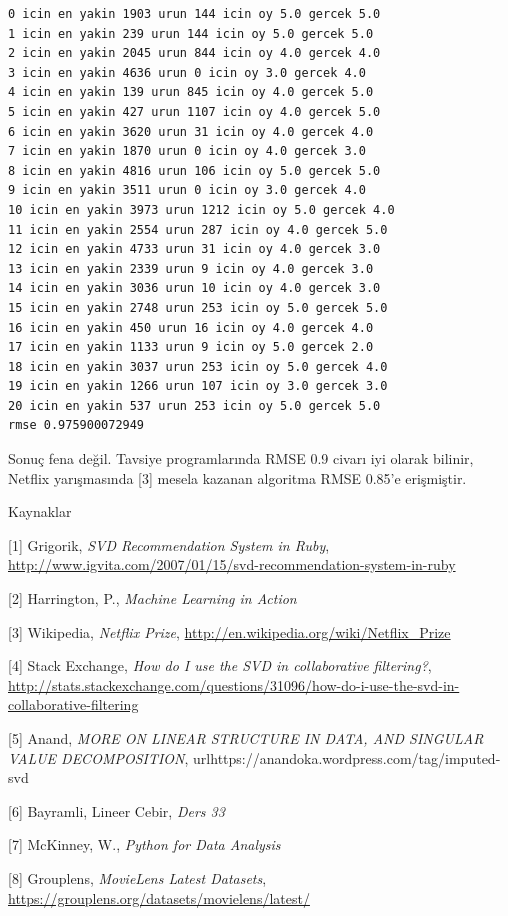 \documentclass[12pt,fleqn]{article}\usepackage{../../common}
\begin{document}
\begin{verbatim}
0 icin en yakin 1903 urun 144 icin oy 5.0 gercek 5.0
1 icin en yakin 239 urun 144 icin oy 5.0 gercek 5.0
2 icin en yakin 2045 urun 844 icin oy 4.0 gercek 4.0
3 icin en yakin 4636 urun 0 icin oy 3.0 gercek 4.0
4 icin en yakin 139 urun 845 icin oy 4.0 gercek 5.0
5 icin en yakin 427 urun 1107 icin oy 4.0 gercek 5.0
6 icin en yakin 3620 urun 31 icin oy 4.0 gercek 4.0
7 icin en yakin 1870 urun 0 icin oy 4.0 gercek 3.0
8 icin en yakin 4816 urun 106 icin oy 5.0 gercek 5.0
9 icin en yakin 3511 urun 0 icin oy 3.0 gercek 4.0
10 icin en yakin 3973 urun 1212 icin oy 5.0 gercek 4.0
11 icin en yakin 2554 urun 287 icin oy 4.0 gercek 5.0
12 icin en yakin 4733 urun 31 icin oy 4.0 gercek 3.0
13 icin en yakin 2339 urun 9 icin oy 4.0 gercek 3.0
14 icin en yakin 3036 urun 10 icin oy 4.0 gercek 3.0
15 icin en yakin 2748 urun 253 icin oy 5.0 gercek 5.0
16 icin en yakin 450 urun 16 icin oy 4.0 gercek 4.0
17 icin en yakin 1133 urun 9 icin oy 5.0 gercek 2.0
18 icin en yakin 3037 urun 253 icin oy 5.0 gercek 4.0
19 icin en yakin 1266 urun 107 icin oy 3.0 gercek 3.0
20 icin en yakin 537 urun 253 icin oy 5.0 gercek 5.0
rmse 0.975900072949
\end{verbatim}

Sonuç fena değil. Tavsiye programlarında RMSE 0.9 civarı iyi olarak
bilinir, Netflix yarışmasında [3] mesela kazanan algoritma RMSE 0.85'e
erişmiştir.

Kaynaklar

[1] Grigorik, {\em SVD Recommendation System in Ruby}, \url{http://www.igvita.com/2007/01/15/svd-recommendation-system-in-ruby}

[2] Harrington, P., {\em Machine Learning in Action}

[3] Wikipedia, {\em Netflix Prize}, \url{http://en.wikipedia.org/wiki/Netflix_Prize}

[4] Stack Exchange, {\em How do I use the SVD in collaborative filtering?}, \url{http://stats.stackexchange.com/questions/31096/how-do-i-use-the-svd-in-collaborative-filtering}

[5] Anand, {\em MORE ON LINEAR STRUCTURE IN DATA, AND SINGULAR VALUE
  DECOMPOSITION}, url{https://anandoka.wordpress.com/tag/imputed-svd}

[6] Bayramli, Lineer Cebir, {\em Ders 33}

[7] McKinney, W., {\em Python for Data Analysis}

[8] Grouplens, {\em MovieLens Latest Datasets},
    \url{https://grouplens.org/datasets/movielens/latest/}
\end{document}

